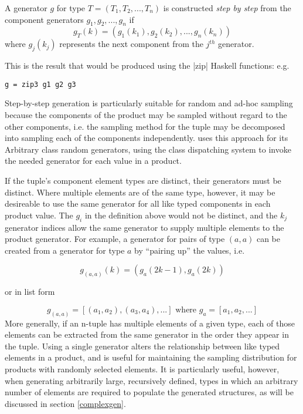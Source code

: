 \begin{df}
A generator $g$ for type $T = (T_1, T_2, ..., T_n)$ 
is constructed   \emph{step by step} from the component generators $g_1, g_2, ..., g_n$
if 
$$ g_{T} (k) = (g_1(k_1), g_2(k_2), ..., g_n(k_n)) $$
\noindent
where $g_j(k_j)$ represents the next component from the $j^{th}$ generator.
\end{df}
\noindent
This is the result that would be produced using the |zip| Haskell functions:
e.g.
\begin{lstlisting}
g = zip3 g1 g2 g3
\end{lstlisting}
\noindent
Step-by-step generation is particularly suitable for random and ad-hoc sampling
because the components of the product may be sampled without regard to the other components,
i.e. the sampling method for the tuple may be decomposed into sampling each of the components independently.
\QC uses this approach for its Arbitrary class random generators,
using the class dispatching system to invoke the needed generator
for each value in a product.

If the tuple's component element types are distinct,
their generators must be distinct.
Where multiple elements are of the same type, however,
it may be desireable to use the same generator
for all like typed components in each product value.
The $g_i$ in the definition above would not be distinct,
and the $k_j$ generator indices allow the same generator to supply
multiple elements to the product generator.
For example, a generator for pairs of type $(a, a)$ can be created from a generator for type $a$
by ``pairing up'' the values, i.e.

$$ g_{(a,a)}(k) = (g_a(2k-1), g_a(2k)) $$

or in list form

$$ g_{(a,a)} = [(a_1, a_2), (a_3, a_4), ...] \text{ where } g_a=[a_1, a_2, ...] $$
\noindent
More generally,
if an n-tuple has multiple elements of a given type,
each of those elements can be extracted from the same generator 
in the order they appear in the tuple.
Using a single generator alters the relationship between like typed elements in a product,
and is useful for maintaining the sampling distribution
for products with randomly selected elements.
It is particularly useful, however,
when generating arbitrarily large, recursively defined, types
in which an arbitrary number of elements are required to populate the generated structures,
as will be discussed in section \ref{complexgen}.

